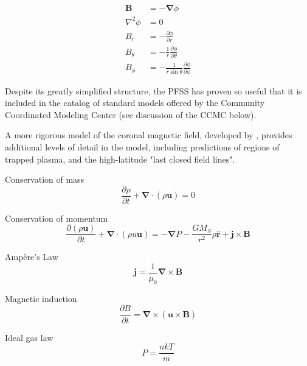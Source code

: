 \documentclass{article}
\begin{document}
\begin{align}
    \mathbf B &= - \mathbf \nabla \phi \\
    \nabla^2 \phi &= 0 \\
    B_r &= - \frac {\partial \phi} {\partial r} \\
    B_{\theta} &= - \frac {1} {r} \frac {\partial \phi} {\partial \theta} \\
    B_{\phi} &= - \frac {1} {r \sin \theta} \frac {\partial \phi} {\partial \phi}
    \label{eq:PFSS}
\end{align}

\noindent Despite its greatly simplified structure, the PFSS has proven so useful that it is included in the catalog of standard models offered by the Community Coordinated Modeling Center (see discussion of the CCMC below).

A more rigorous model of the coronal magnetic field, developed by \cite{Endeve2003}, provides additional levels of detail in the model, including predictions of regions of trapped plasma, and the high-latitude "last closed field lines".

\bigskip

Conservation of mass
\begin{equation}
    \frac {\partial \rho} {\partial t} + \mathbf \nabla \cdotp \left(\rho \mathbf u \right) = 0
    \label{eq:ELH1}
\end{equation}

Conservation of momentum
\begin{equation}
    \frac {\partial \left( \rho \mathbf u \right)} {\partial t} + \mathbf \nabla \cdotp \left(\rho u \mathbf u \right) = - \mathbf \nabla P - \frac {G M_S} {r^2} \rho \mathbf {\hat r} + \mathbf j \times \mathbf B
    \label{eq:ELH2}
\end{equation}

Amp\`ere's Law
\begin{equation}
    \mathbf j = \frac {1} {\mu_0} \mathbf \nabla \times \mathbf B
    \label{eq:ELH3}
\end{equation}

Magnetic induction
\begin{equation}
    \frac {\partial B} {\partial t} = \mathbf \nabla \times \left( \mathbf u \times \mathbf B \right)
    \label{eq:ELH4}
\end{equation}

Ideal gas law
\begin{equation}
    P = \frac {n k T} {m}
    \label{eq:ELH5}
\end{equation}
\end{document}
